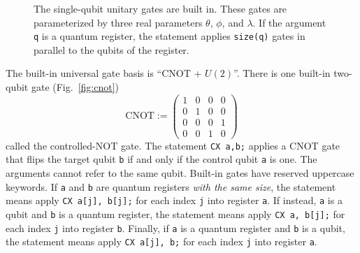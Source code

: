 \documentclass[USenglish,12pt,fleqn]{article} %
\newcommand*{\code}{\texttt}
\begin{document}
\begin{figure}
\hspace{.2\textwidth}
\begin{minipage}{.2\textwidth}

\end{minipage}
\hspace{.1\textwidth}
\begin{minipage}{.2\textwidth}

\end{minipage}
\caption{The single-qubit unitary gates are built in. These gates are parameterized by three real parameters $\theta$, $\phi$, and $\lambda$. If the argument \code{q} is a quantum register, the statement applies \code{size(q)} gates in parallel to the qubits of the register.\label{fig:utpl}}
\end{figure}

The built-in universal gate basis is ``CNOT + $U(2)$''. There is one built-in two-qubit gate (Fig.~\ref{fig:cnot})
\begin{equation}
\mathrm{CNOT} := \left(\begin{array}{cccc}
1 & 0 & 0 & 0 \\
0 & 1 & 0 & 0 \\
0 & 0 & 0 & 1 \\
0 & 0 & 1 & 0 \end{array}\right)
\end{equation}
called the controlled-NOT gate. The statement \code{CX a,b;} applies a CNOT gate that flips the target qubit \code{b} if and only if the control qubit \code{a} is one. The arguments cannot refer to the same qubit. Built-in gates have reserved uppercase keywords. If \code{a} and \code{b} are quantum registers {\em with the same size}, the statement means apply \code{CX a[j], b[j];} for each index \code{j} into register \code{a}. If instead, \code{a} is a qubit and \code{b} is a quantum register, the statement means apply \code{CX a, b[j];} for each index \code{j} into register \code{b}. Finally, if \code{a} is a quantum register and \code{b} is a qubit, the statement means apply \code{CX a[j], b;} for each index \code{j} into register \code{a}.
\end{document}
